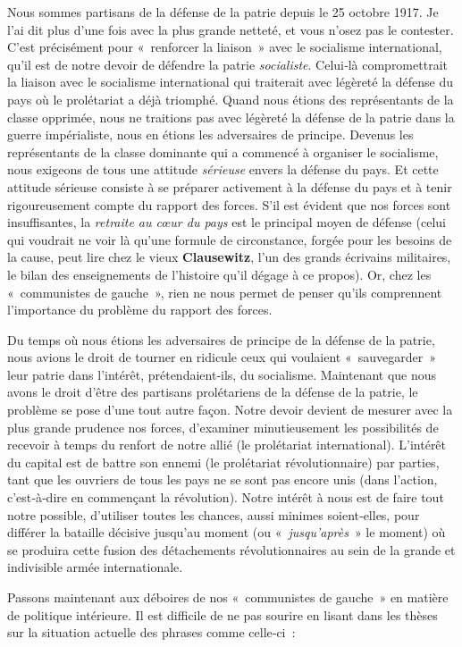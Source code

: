 \documentclass[french,twoside]{book} %
\begin{document}
Nous sommes partisans de la défense de la patrie depuis le 25 octobre 1917. Je l’ai dit plus d’une fois avec la plus grande netteté, et vous n’osez pas le contester. C'est précisément pour « renforcer la liaison » avec le socialisme international, qu’il est de notre devoir de défendre la pa­trie \emph{socialiste}. Celui‑là compromettrait la liaison avec le socialisme international qui traiterait avec légèreté la dé­fense du pays où le prolétariat a déjà triomphé. Quand nous étions des représentants de la classe opprimée, nous ne traitions pas avec légèreté la défense de la patrie dans la guerre impérialiste, nous en étions les adversaires de principe. Devenus les représentants de la classe dominante qui a commencé à organiser le socialisme, nous exigeons de tous une attitude \emph{sérieuse} envers la défense du pays. Et cette attitude sérieuse consiste à se préparer activement à la défense du pays et à tenir rigoureusement compte du rapport des forces. S'il est évident que nos forces sont insuffisantes, la \emph{retraite au cœur du pays} est le principal moyen de défense (celui qui voudrait ne voir là qu’une formule de circonstance, forgée pour les besoins de la cause, peut lire chez le vieux \textbf{Clausewitz}, l’un des grands écrivains militaires, le bilan des enseignements de l’histoire qu’il dégage à ce propos). Or, chez les « communistes de gauche », rien ne nous permet de penser qu’ils comprennent l’importance du problème du rapport des forces.\par
Du temps où nous étions les adversaires de principe de la défense de la patrie, nous avions le droit de tourner en ridicule ceux qui voulaient « sauvegarder » leur patrie dans l’intérêt, prétendaient‑ils, du socialisme. Maintenant que nous avons le droit d’être des partisans prolétariens de la défense de la patrie, le problème se pose d’une tout autre façon. Notre devoir devient de mesurer avec la plus grande prudence nos forces, d’examiner minutieusement les possi­bilités de recevoir à temps du renfort de notre allié (le pro­létariat international). L'intérêt du capital est de battre son ennemi (le prolétariat révolutionnaire) par parties, tant que les ouvriers de tous les pays ne se sont pas encore unis (dans l’action, c’est‑à‑dire en commençant la révolu­tion). Notre intérêt à nous est de faire tout notre possible, d’utiliser toutes les chances, aussi minimes soient‑elles, pour différer la bataille décisive jusqu’au moment (ou « \emph{jusqu’après} » le moment) où se produira cette fusion des détachements révolutionnaires au sein de la grande et indivisible armée internationale.\par
Passons maintenant aux déboires de nos « communistes de gauche » en matière de politique intérieure. Il est difficile de ne pas sourire en lisant dans les thèses sur la situation actuelle des phrases comme celle‑ci :\par
\end{document}
